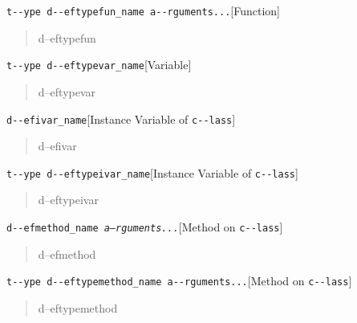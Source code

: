 \documentclass{book}
\begin{document}
\noindent\texttt{t{-}{-}ype d{-}{-}eftypefun\_name a{-}{-}rguments...}\hfill[Function]



%
\begin{quote}
\unskip{\parskip=0pt\noindent}%
d--eftypefun
\end{quote}

\noindent\texttt{t{-}{-}ype d{-}{-}eftypevar\_name}\hfill[Variable]



%
\begin{quote}
\unskip{\parskip=0pt\noindent}%
d--eftypevar
\end{quote}

\noindent\texttt{d{-}{-}efivar\_name}\hfill[Instance Variable of \texttt{c{-}{-}lass}]



%
\begin{quote}
\unskip{\parskip=0pt\noindent}%
d--efivar
\end{quote}

\noindent\texttt{t{-}{-}ype d{-}{-}eftypeivar\_name}\hfill[Instance Variable of \texttt{c{-}{-}lass}]



%
\begin{quote}
\unskip{\parskip=0pt\noindent}%
d--eftypeivar
\end{quote}

\noindent\texttt{d{-}{-}efmethod\_name \EmbracOn{}\textnormal{\textsl{a--rguments...}}\EmbracOff{}}\hfill[Method on \texttt{c{-}{-}lass}]



%
\begin{quote}
\unskip{\parskip=0pt\noindent}%
d--efmethod
\end{quote}

\noindent\texttt{t{-}{-}ype d{-}{-}eftypemethod\_name a{-}{-}rguments...}\hfill[Method on \texttt{c{-}{-}lass}]



%
\begin{quote}
\unskip{\parskip=0pt\noindent}%
d--eftypemethod
\end{quote}
\end{document}
